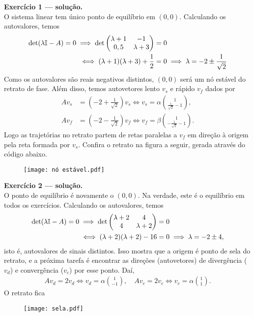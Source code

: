 	\noindent
	\textbf{\sffamily Exercício 1 --- solução.} \\
	O sistema linear tem único ponto de equilíbrio em $(0,0)$. 
	Calculando os autovalores, temos 
	\begin{align*}
		\det(\lambda\mathbb{I} - A) = 0 \implies
		\det
		\begin{pmatrix}
			\lambda+1 & -1 \\
			0,5 & \lambda+3
		\end{pmatrix}
		&= 0 \\
		\iff
		(\lambda+1)(\lambda+3) + \frac{1}{2} &= 0 
		\implies 
		\lambda = -2 \pm \frac{1}{\sqrt{2}}
	\end{align*}
	Como os autovalores são reais negativos distintos, $(0,0)$ será um nó estável do retrato de fase. 
	Além disso, temos autovetores lento $v_s$ e rápido $v_f$ dados por 
	\begin{align*}
		Av_s &= \left(-2+\frac{1}{\sqrt{2}}\right) v_s \iff 
		v_s = \alpha \binom{1}{\frac{1}{\sqrt{2}}-1},
		\\
		Av_f &= \left(-2-\frac{1}{\sqrt{2}}\right) v_f \iff 
		v_f = \beta \binom{1}{-\frac{1}{\sqrt{2}}-1} 
		.
	\end{align*}
	Logo as trajetórias no retrato partem de retas paralelas a $v_f$ em direção à origem pela reta formada por $v_s$.
	Confira o retrato na figura a seguir, gerada através do código abaixo.
	\begin{figure}[H]\centering
		\texttt{[image: nó estável.pdf]} 
	\end{figure}
	
	
	\noindent
	\textbf{\sffamily Exercício 2 --- solução.} \\
	O ponto de equilíbrio é novamente o $(0,0)$. 
	Na verdade, este é o equilíbrio em todos os exercícios.
	Calculando os autovalores, temos
	\begin{align*}
		\det(\lambda\mathbb{I} - A) = 0 \implies
		\det
		\begin{pmatrix}
			\lambda+2 & 4 \\
			4 & \lambda+2
		\end{pmatrix}
		&= 0 \\
		\iff
		(\lambda+2)(\lambda+2) - 16 &= 0 
		\implies 
		\lambda = -2 \pm 4,
	\end{align*}
	isto é, autovalores de sinais distintos. 
	Isso mostra que a origem é ponto de sela do retrato, e a próxima tarefa é encontrar as direções (autovetores) de divergência ($v_d$) e convergência ($v_c$) por esse ponto. 
	Daí,
	\begin{align*}
		Av_d = 2v_d \iff v_d = \alpha\binom{1}{-1} ,
		\quad
		Av_c = 2v_c \iff v_c = \alpha\binom{1}{1} . 
	\end{align*}
	O retrato fica
	\begin{figure}[H]\centering
		\texttt{[image: sela.pdf]} 
	\end{figure}
	
